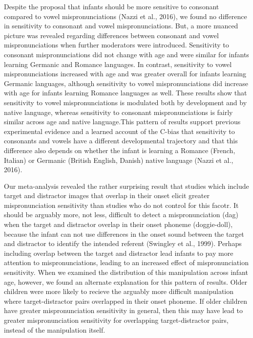 \documentclass[man]{apa6}
\begin{document}
Despite the proposal that infants should be more sensitive to consonant compared to vowel mispronunciations (Nazzi et al., 2016), we found no difference in sensitivity to consonant and vowel mispronunciations. But, a more nuanced picture was revealed regarding differences between consonant and vowel mispronunciations when further moderators were introduced. Sensitivity to consonant mispronunciations did not change with age and were similar for infants learning Germanic and Romance languages. In contrast, sensitivity to vowel mispronunciations increased with age and was greater overall for infants learning Germanic languages, although sensitivity to vowel mispronunciations did increase with age for infants learning Romance languages as well. These results show that sensitivity to vowel mispronunciations is modulated both by development and by native language, whereas sensitivity to consonant mispronunciations is fairly similar across age and native language.This pattern of results support previous experimental evidence and a learned account of the C-bias that sensitivity to
consonants and vowels have a different developmental trajectory and that this difference also depends on whether the infant is learning a Romance (French, Italian) or Germanic (British English, Danish) native language (Nazzi et al., 2016).

Our meta-analysis revealed the rather surprising result that studies which include target and distractor images that overlap in their onset elicit greater mispronunciation sensitivity than studies who do not control for this facotr. It should be arguably more, not less, difficult to detect a mispronunciation (dag) when the target and distractor overlap in their onset phoneme (doggie-doll), because the infant can not use differences in the onset sound between the target and distractor to identify the intended referent (Swingley et al., 1999). Perhaps including overlap between the target and distractor lead infants to pay more attention to mispronunciations, leading to an increased effect of mispronunciation sensitivity. When we examined the distribution of this manipulation across infant age, however, we found an alternate explanation for this pattern of results. Older children were more likely to recieve the arguably more difficult manipulation where target-distractor pairs overlapped in their onset phoneme. If older children have greater mispronunciation sensitivity in general, then this may have lead to greater mispronunciation sensitivity for overlapping target-distractor pairs, instead of the manipulation itself.
\end{document}
